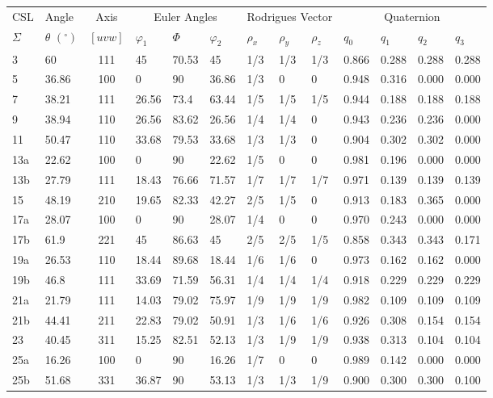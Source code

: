 \begin{table}[t]
\centering\leavevmode
{\footnotesize\begin{tabular}{|l|l|c|l|l|l|l|l|l|l|l|l|l|}
\hline
CSL & Angle & Axis & \multicolumn{3}{c|}{Euler Angles} & \multicolumn{3}{c|}{Rodrigues Vector} & \multicolumn{4}{c|}{Quaternion}\\
$\Sigma$ & $\theta$ $({}^{\circ})$ & $[uvw]$ & $\varphi_1$ & $\Phi$ & $\varphi_2$ & $\rho_x$ & $\rho_y$ & $\rho_z$ & $q_0$ & $q_1$ & $q_2$ & $q_3$\\
\hline\hline
3&60&  111&  45& 70.53& 45&  1/3&  1/3&  1/3& 0.866 &0.288& 0.288& 0.288\\
5&36.86&  100&  0&  90& 36.86&  1/3&  0&0&  0.948 & 0.316 & 0.000& 0.000\\
7&38.21&  111&  26.56& 73.4&  63.44&  1/5&1/5&1/5&  0.944 & 0.188& 0.188& 0.188\\
9&38.94&  110&  26.56& 83.62& 26.56&  1/4&  1/4&  0&  0.943 & 0.236& 0.236 &0.000 \\
11&  50.47&  110&  33.68& 79.53& 33.68&  1/3&  1/3&  0&  0.904 & 0.302& 0.302& 0.000\\
\hline
13a& 22.62&  100&  0&  90& 22.62&  1/5&0&0&  0.981& 0.196 & 0.000& 0.000\\
13b& 27.79&  111&  18.43& 76.66& 71.57&  1/7& 1/7& 1/7& 0.971 & 0.139& 0.139& 0.139\\
15&  48.19&  210&  19.65& 82.33& 42.27&  2/5&1/5&0& 0.913 & 0.183& 0.365& 0.000\\
17a& 28.07&  100&  0&  90& 28.07&  1/4&  0&0&  0.970 & 0.243& 0.000& 0.000\\
17b& 61.9&221&  45& 86.63& 45&  2/5&2/5&1/5&  0.858 & 0.343& 0.343& 0.171\\
\hline
19a& 26.53&  110&  18.44& 89.68& 18.44&  1/6&  1/6&  0&  0.973 & 0.162& 0.162& 0.000\\
19b& 46.8&111&  33.69& 71.59& 56.31&  1/4&  1/4&  1/4& 0.918 & 0.229& 0.229& 0.229\\
21a& 21.79&  111&  14.03& 79.02& 75.97&  1/9&  1/9&  1/9& 0.982 & 0.109& 0.109& 0.109\\
21b& 44.41&  211&  22.83& 79.02& 50.91&  1/3&  1/6&  1/6& 0.926 & 0.308& 0.154& 0.154\\
23&  40.45&  311&  15.25& 82.51& 52.13&  1/3&  1/9&  1/9& 0.938 & 0.313& 0.104& 0.104\\
\hline
25a& 16.26&  100&  0&  90& 16.26&  1/7& 0&0&  0.989 & 0.142& 0.000& 0.000\\
25b& 51.68&  331&  36.87& 90& 53.13&  1/3&  1/3&  1/9&0.900 & 0.300& 0.300& 0.100\\

\end{tabular}}
\end{table}
